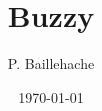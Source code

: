 \documentclass[12pt, a4paper]{article}
\begin{document}
\title{Buzzy}
\author{P. Baillehache}
\date{\today}
\maketitle

\tableofcontents


\end{document}
